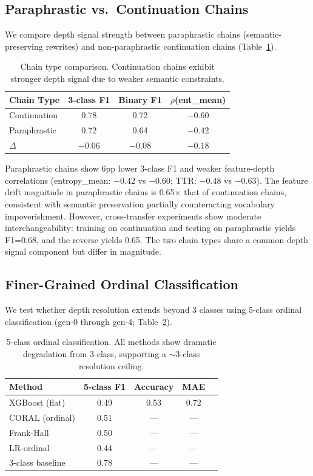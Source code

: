 \documentclass[11pt,a4paper]{article}
\begin{document}
\subsection{Paraphrastic vs.\ Continuation Chains}
\label{sec:para}

We compare depth signal strength between paraphrastic chains (semantic-preserving rewrites) and non-paraphrastic continuation chains (Table~\ref{tab:para}).

\begin{table}[h]
\centering
\begin{tabular}{lccc}
\toprule
\textbf{Chain Type} & \textbf{3-class F1} & \textbf{Binary F1} & \textbf{$\rho$(ent\_mean)} \\
\midrule
Continuation & 0.78 & 0.72 & $-0.60$ \\
Paraphrastic & 0.72 & 0.64 & $-0.42$ \\
\midrule
$\Delta$ & $-0.06$ & $-0.08$ & $-0.18$ \\
\bottomrule
\end{tabular}
\caption{Chain type comparison. Continuation chains exhibit stronger depth signal due to weaker semantic constraints.}
\label{tab:para}
\end{table}

Paraphrastic chains show 6pp lower 3-class F1 and weaker feature-depth correlations (entropy\_mean: $-0.42$ vs $-0.60$; TTR: $-0.48$ vs $-0.63$).
The feature drift magnitude in paraphrastic chains is 0.65$\times$ that of continuation chains, consistent with semantic preservation partially counteracting vocabulary impoverishment.
However, cross-transfer experiments show moderate interchangeability: training on continuation and testing on paraphrastic yields F1=0.68, and the reverse yields 0.65.
The two chain types share a common depth signal component but differ in magnitude.

\subsection{Finer-Grained Ordinal Classification}
\label{sec:ordinal}

We test whether depth resolution extends beyond 3 classes using 5-class ordinal classification (gen-0 through gen-4; Table~\ref{tab:5class}).

\begin{table}[h]
\centering
\begin{tabular}{lcccc}
\toprule
\textbf{Method} & \textbf{5-class F1} & \textbf{Accuracy} & \textbf{MAE} \\
\midrule
XGBoost (flat) & 0.49 & 0.53 & 0.72 \\
CORAL (ordinal) & 0.51 & --- & --- \\
Frank-Hall & 0.50 & --- & --- \\
LR-ordinal & 0.44 & --- & --- \\
\midrule
3-class baseline & 0.78 & --- & --- \\
\bottomrule
\end{tabular}
\caption{5-class ordinal classification. All methods show dramatic degradation from 3-class, supporting a $\sim$3-class resolution ceiling.}
\label{tab:5class}
\end{table}
\end{document}
